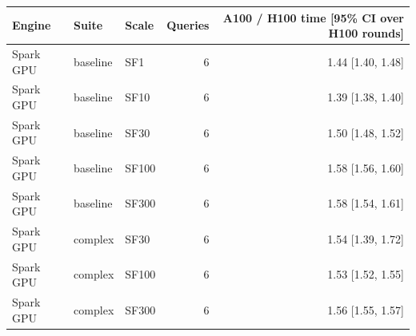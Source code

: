 \begin{tabular}{lllrr}
\toprule
Engine & Suite & Scale & Queries & A100 / H100 time [95\% CI over H100 rounds] \\
\midrule
Spark GPU & baseline & SF1 & 6 & 1.44 [1.40, 1.48] \\
Spark GPU & baseline & SF10 & 6 & 1.39 [1.38, 1.40] \\
Spark GPU & baseline & SF30 & 6 & 1.50 [1.48, 1.52] \\
Spark GPU & baseline & SF100 & 6 & 1.58 [1.56, 1.60] \\
Spark GPU & baseline & SF300 & 6 & 1.58 [1.54, 1.61] \\
Spark GPU & complex & SF30 & 6 & 1.54 [1.39, 1.72] \\
Spark GPU & complex & SF100 & 6 & 1.53 [1.52, 1.55] \\
Spark GPU & complex & SF300 & 6 & 1.56 [1.55, 1.57] \\
\bottomrule
\end{tabular}
